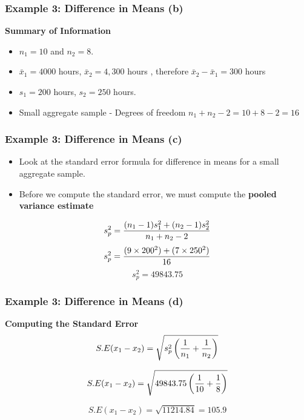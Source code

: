 \documentclass[a4]{beamer}
\begin{document}
\begin{frame}
\frametitle{Example 3: Difference in Means (b) }
\textbf{Summary of Information}
\begin{itemize}\item $n_1 = 10$ and $n_2 = 8$.
\item $\bar{x}_1 = 4000$ hours, $\bar{x}_2 = 4,300 $ hours , therefore  $\bar{x}_2 - \bar{x}_1 = 300$ hours
\item $s_1  = 200$ hours, $s_2 = 250$ hours.
\item Small aggregate sample - Degrees of freedom $n_1 + n_2 - 2 = 10 + 8 - 2 = 16$
\end{itemize}\end{frame}
\begin{frame}
\frametitle{Example 3: Difference in Means (c) }
\begin{itemize}
\item Look at the standard error formula for difference in means for a small aggregate sample.
\item Before we compute the standard error, we must compute the \textbf{pooled variance estimate}
\end{itemize}
\[ s^2_p = {(n_1 - 1)s^2_1  + (n_2 - 1)s^2_ 2\over n_1 + n_2 - 2 } \]\[s^2_p = {(9 \times 200^2 ) +( 7 \times 250^2) \over 16 }  \]
\[ s^2_p  = 49843.75 \]
\end{frame}

\begin{frame}
\frametitle{Example 3: Difference in Means (d) }
\textbf{Computing the Standard Error}
\[ S.E(x_1 - x_2) = \sqrt{s^2_p \left({1\over n_1}+{1\over n_2} \right)}\]

\[ S.E(x_1 - x_2) = \sqrt{49843.75 \left({1\over 10}+{1\over 8} \right)}\]

\[ S.E(x_1 - x_2) = \sqrt{11214.84} = 105.9\]

\end{frame}
\end{document}
